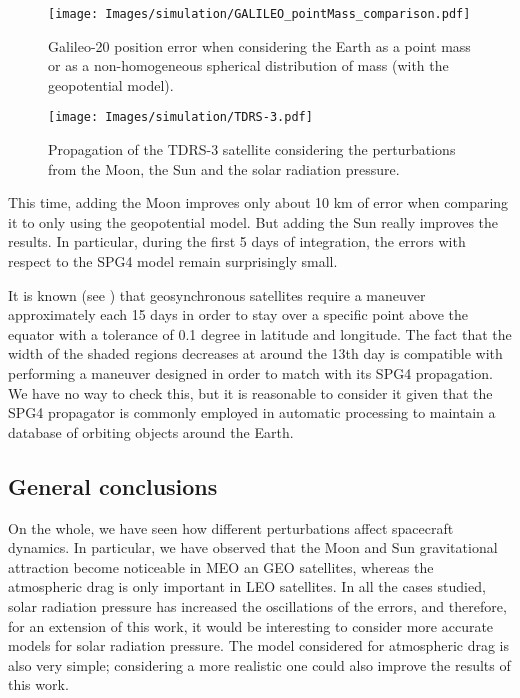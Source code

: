\documentclass[../main.tex]{subfiles}
\begin{document}
\begin{figure}[ht]
  \centering
  \begin{minipage}[ht]{0.45\textwidth}
    \centering
    \texttt{[image: Images/simulation/GALILEO\_pointMass\_comparison.pdf]}
    \caption{Galileo-20 position error when considering the Earth as a point mass or as a non-homogeneous spherical distribution of mass (with the geopotential model).}
    \label{fig:Galileo_point}
  \end{minipage}
  \hspace{0.0333333\textwidth}
  \begin{minipage}[ht]{0.45\textwidth}
    \centering
    \texttt{[image: Images/simulation/TDRS-3.pdf]}
    \caption{Propagation of the TDRS-3 satellite considering the perturbations from the Moon, the Sun and the solar radiation pressure.}
    \label{fig:TDRS}
  \end{minipage}
\end{figure}

This time, adding the Moon improves only about 10 km of error when comparing it to only using the geopotential model. But adding the Sun really improves the results. In particular, during the first 5 days of integration, the errors with respect to the SPG4 model remain surprisingly small.

It is known (see \cite{montenbruck}) that geosynchronous satellites require a maneuver approximately each 15 days in order to stay over a specific point above the equator with a tolerance of 0.1 degree in latitude and longitude. The fact that the width of the shaded regions decreases at around the 13th day is compatible with performing a maneuver designed in order to match with its SPG4 propagation. We have no way to check this, but it is reasonable to consider it given that the SPG4 propagator is commonly employed in automatic processing to maintain a database of orbiting objects around the Earth.

\subsection{General conclusions}
On the whole, we have seen how different perturbations affect spacecraft dynamics. In particular, we have observed that the Moon and Sun gravitational attraction become noticeable in MEO an GEO satellites, whereas the atmospheric drag is only important in LEO satellites. In all the cases studied, solar radiation pressure has increased the oscillations of the errors, and therefore, for an extension of this work, it would be interesting to consider more accurate models for solar radiation pressure. The model considered for atmospheric drag is also very simple; considering a more realistic one could also improve the results of this work.
\end{document}
